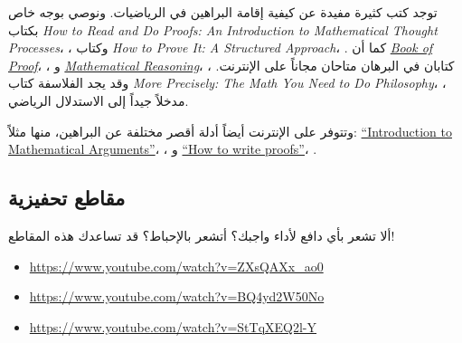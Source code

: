 \documentclass[../../../include/open-logic-section]{subfiles}
\begin{document}


توجد كتب كثيرة مفيدة عن كيفية إقامة البراهين في الرياضيات. ونوصي بوجه
خاص بكتاب \emph{How to Read and Do Proofs: An Introduction to
Mathematical Thought Processes}، \citep{Solow2013}، وكتاب
\emph{How to Prove It: A Structured Approach}، \citep{Velleman2019}.
كما أن
\href{http://www.people.vcu.edu/~rhammack/BookOfProof/BookOfProof.pdf}{\emph{Book
of Proof}}، \citep{Hammack2013}، و
\href{https://scholarworks.gvsu.edu/books/7/}{\emph{Mathematical
Reasoning}}، \citep{Sandstrum2019}، كتابان في البرهان متاحان مجاناً على
الإنترنت. وقد يجد الفلاسفة كتاب
\emph{More Precisely: The Math You Need to Do Philosophy}،
\citep{Steinhart2018}، مدخلاً جيداً إلى الاستدلال الرياضي.

وتتوفر على الإنترنت أيضاً أدلة أقصر مختلفة عن البراهين، منها مثلاً:
\href{https://math.berkeley.edu/~hutching/teach/proofs.pdf}{``Introduction
  to Mathematical Arguments''}، \citep{Hutchings2003}، و
\href{https://eugeniacheng.com/wp-content/uploads/2017/02/cheng-proofguide.pdf}{``How to
  write proofs''}، \citep{Cheng2004}.

\subsection{مقاطع تحفيزية}

ألا تشعر بأي دافع لأداء واجبك؟ أتشعر بالإحباط؟ قد تساعدك هذه المقاطع!

\begin{itemize}
\item \url{https://www.youtube.com/watch?v=ZXsQAXx_ao0}
\item \url{https://www.youtube.com/watch?v=BQ4yd2W50No}
\item \url{https://www.youtube.com/watch?v=StTqXEQ2l-Y}
\end{itemize}
\end{document}

